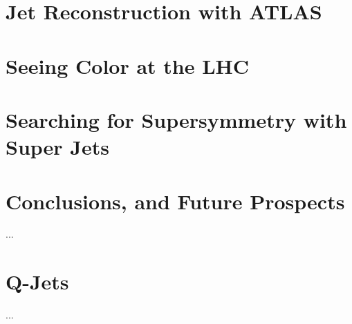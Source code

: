 \documentclass{report}
\begin{document}
\chapter{Jet Reconstruction with ATLAS}


\chapter{Seeing Color at the LHC}


\chapter{Searching for Supersymmetry with Super Jets}



\chapter{Conclusions, and Future Prospects}
         ...
\appendix
\chapter{Q-Jets}
         ...


\end{document}
